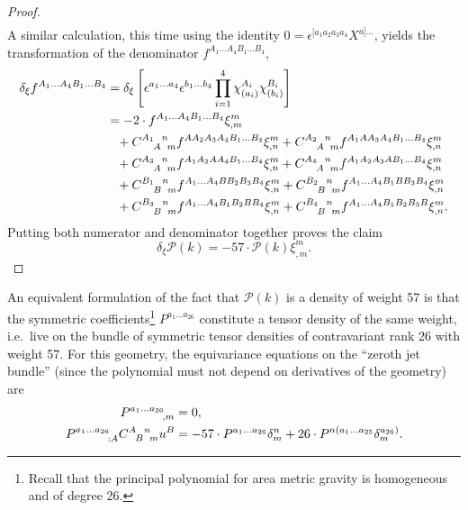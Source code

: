 \begin{proof}
\begin{equation}
\begin{aligned}
    \end{aligned}
  \end{equation}
  A similar calculation, this time using the identity $0 = \epsilon^{\lbrack a_1a_2a_3a_4} X^{a\rbrack\dots}$, yields the transformation of the denominator $f^{A_1\dots A_4B_1\dots B_4}$,
  \begin{equation}
    \begin{aligned}
      \delta_\xi f^{A_1\dots A_4B_1\dots B_4} &{} = \delta_\xi\left\lbrack \epsilon^{a_1\dots a_4} \epsilon^{b_1\dots b_4} \prod_{i=1}^4 \chi^{A_i}_{(a_i)} \chi^{B_i}_{(b_i)} \right\rbrack \\
                                                  &{} = -2 \cdot f^{A_1\dots A_4B_1\dots B_4} \xi^m_{,m} \\
                                                  &{} \hphantom{=} + \gmc{A_1}{A}{n}{m} f^{AA_2A_3A_4B_1\dots B_4} \xi^m_{,n} + \gmc{A_2}{A}{n}{m} f^{A_1AA_3A_4B_1\dots B_4} \xi^m_{,n} \\
                                                  &{} \hphantom{=} + \gmc{A_3}{A}{n}{m} f^{A_1A_2AA_4B_1\dots B_4} \xi^m_{,n} + \gmc{A_4}{A}{n}{m} f^{A_1A_2A_3AB_1\dots B_4} \xi^m_{,n} \\
                                                  &{} \hphantom{=} + \gmc{B_1}{B}{n}{m} f^{A_1\dots A_4BB_2B_3B_4} \xi^m_{,n} + \gmc{B_2}{B}{n}{m} f^{A_1\dots A_4B_1BB_3B_4} \xi^m_{,n} \\
                                                  &{} \hphantom{=} + \gmc{B_3}{B}{n}{m} f^{A_1\dots A_4B_1B_2BB_4} \xi^m_{,n} + \gmc{B_4}{B}{n}{m} f^{A_1\dots A_4B_1B_2B_3B} \xi^m_{,n}.
    \end{aligned}
  \end{equation}
  Putting both numerator and denominator together proves the claim
  \begin{equation}
    \delta_\xi \mathcal P(k) = -57 \cdot \mathcal P(k) \xi^m_{,m}.
  \end{equation}
\end{proof}
An equivalent formulation of the fact that $\mathcal P(k)$ is a density of weight 57 is that the symmetric coefficients\footnote{Recall that the principal polynomial for area metric gravity is homogeneous and of degree 26.} $P^{a_1\dots a_{26}}$ constitute a tensor density of the same weight, i.e.~live on the bundle of symmetric tensor densities of contravariant rank 26 with weight 57. For this geometry, the equivariance equations on the ``zeroth jet bundle'' (since the polynomial must not depend on derivatives of the geometry) are
\begin{equation}\label{polynomial_equivariance_eqns}
  \begin{aligned}
    P^{a_1\dots a_{26}}_{\hphantom{a_1\dots a_{26}},m} &{} = 0, \\
    P^{a_1\dots a_{26}}_{\hphantom{a_1\dots a_{26}}:A} \gmc{A}{B}{n}{m} u^B &{} = - 57\cdot P^{a_1\dots a_{26}} \delta^n_m + 26\cdot P^{n(a_1\dots a_{25}} \delta^{a_{26})}_m.
  \end{aligned}
\end{equation}


